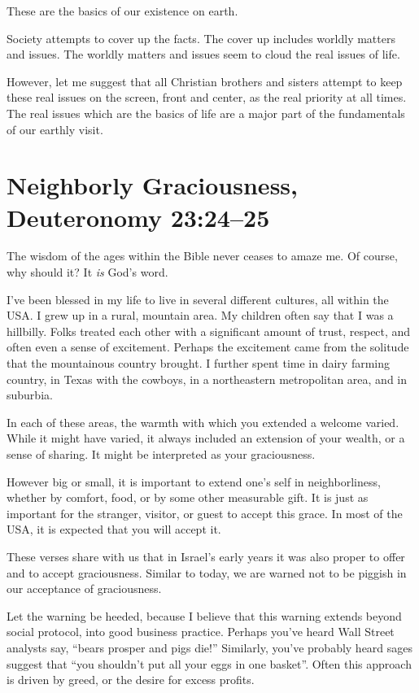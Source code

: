 \documentclass[12pt]{memoir}
\begin{document}
These are the basics of our existence on earth.

Society attempts to cover up the facts. The cover up includes worldly matters
and issues. The worldly matters and issues seem to cloud the real issues of life.

However, let me suggest that all Christian brothers and sisters
attempt to keep these real issues on the screen, front and center,
as the real priority at all times. The real issues which are the basics
of life are a major part of the fundamentals of our earthly visit. 

\section[Neighborly Graciousness]{Neighborly Graciousness, Deuteronomy 23:24--25}
  

The wisdom of the ages within the Bible never ceases to amaze me. Of course, why should it? It \emph{is} God's word.

I've been blessed in my life to live in several different cultures,
all within the USA. I grew up in a rural, mountain area. My children often say that I was a hillbilly. Folks treated each other with a
significant amount of trust, respect, and often even a sense of excitement.
Perhaps the excitement came from the solitude that the mountainous
country brought. I further spent time in dairy farming country, in
Texas with the cowboys, in a northeastern metropolitan area, and in suburbia.

In each of these areas, the warmth with which you extended a welcome varied. While it might have varied, it always included an extension of your wealth, or a sense of sharing. It might be interpreted as your graciousness. 

However big or small, it is important to extend one's self in neighborliness, whether by comfort,
food, or by some other measurable gift. It is just as important for
the stranger, visitor, or guest to accept this grace. In most of the USA, it is expected that you will accept it. 

These verses share with us that in Israel's early years it was also proper to offer and to accept graciousness. Similar to today, we are
warned not to be piggish in our acceptance of graciousness. 

Let the warning be heeded, because I believe that this warning extends beyond social protocol,
into good business practice. Perhaps you've heard Wall Street analysts say, ``bears prosper and pigs die!'' Similarly, you've probably
heard sages suggest that ``you shouldn't put all your eggs in one basket''. Often this approach is driven by greed, or the desire for
excess profits. 
\end{document}
